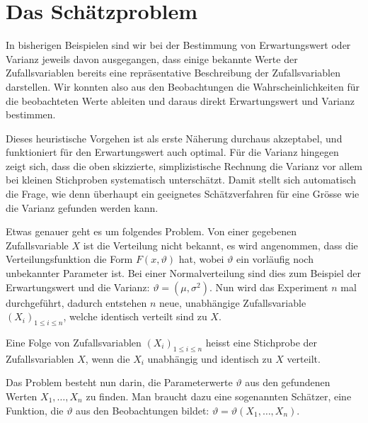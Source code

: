 \section{Das Schätzproblem}
\label{section-schaetzproblem}
In bisherigen Beispielen sind wir bei der Bestimmung von Erwartungswert
oder Varianz jeweils davon ausgegangen, dass einige bekannte Werte der
Zufallsvariablen bereits eine repräsentative Beschreibung der Zufallsvariablen
darstellen.
Wir konnten also aus den Beobachtungen die Wahrscheinlichkeiten
für die beobachteten Werte ableiten und daraus direkt Erwartungswert
und Varianz bestimmen.

Dieses heuristische Vorgehen ist als erste Näherung durchaus akzeptabel,
und funktioniert für den Erwartungswert auch optimal.
Für die Varianz
hingegen zeigt sich, dass die oben skizzierte, simplizistische Rechnung
die Varianz vor allem bei kleinen Stichproben systematisch unterschätzt.
Damit stellt sich automatisch die Frage, wie denn überhaupt ein geeignetes
Schätzverfahren für eine Grösse wie die Varianz gefunden werden kann.

Etwas genauer geht es um folgendes Problem.
Von einer gegebenen Zufallsvariable
$X$ ist die Verteilung nicht bekannt, es wird angenommen, dass die
Verteilungsfunktion die Form $F(x,\vartheta)$ hat, wobei
$\vartheta$ ein vorläufig noch unbekannter Parameter ist.
Bei einer Normalverteilung sind dies zum Beispiel der Erwartungswert und
die Varianz: $\vartheta=(\mu,\sigma^2)$.
Nun wird das
Experiment $n$ mal durchgeführt, dadurch entstehen $n$ neue, unabhängige
Zufallsvariable $(X_i)_{1\le i\le n}$, welche identisch verteilt sind zu
$X$.

\begin{definition}
Eine Folge von Zufallsvariablen $(X_i)_{1\le i\le n}$ heisst eine
Stichprobe der Zufallsvariablen $X$, wenn die $X_i$ unabhängig 
und identisch zu $X$ verteilt.
\end{definition}
Das Problem besteht nun darin, die Parameterwerte $\vartheta$
aus den gefundenen Werten $X_1,\dots,X_n$ zu finden.
Man braucht dazu
eine sogenannten Schätzer, eine Funktion, die $\vartheta$ aus den
Beobachtungen bildet: $\vartheta=\vartheta(X_1,\dots,X_n)$.

